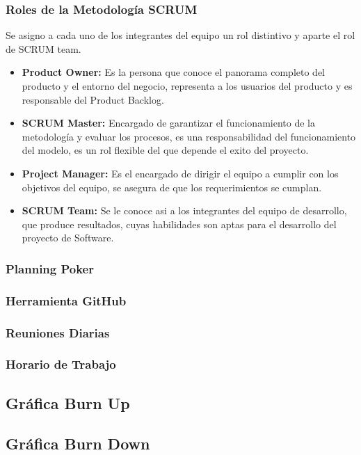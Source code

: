\subsubsection{Roles de la Metodología SCRUM}

Se asigno a cada uno de los integrantes del equipo un rol distintivo y aparte el rol de SCRUM team.

\begin{itemize}
	\item \textbf{Product Owner:} Es la persona que conoce el panorama completo del producto y el entorno del negocio, representa a los usuarios del producto y es responsable del Product Backlog.
	\item \textbf{SCRUM Master:} Encargado de garantizar el funcionamiento de la metodología y evaluar los procesos, es una responsabilidad del funcionamiento del modelo, es un rol flexible del que depende el exito del proyecto.
	\item \textbf{Project Manager:} Es el encargado de dirigir el equipo a cumplir con los objetivos del equipo, se asegura de que los requerimientos se cumplan.
	\item \textbf{SCRUM Team:} Se le conoce asi a los integrantes del equipo de desarrollo, que produce resultados, cuyas habilidades son aptas para el desarrollo del proyecto de Software.
\end{itemize}




\subsubsection{Planning Poker}

\subsubsection{Herramienta GitHub}

\subsubsection{Reuniones Diarias}

\subsubsection{Horario de Trabajo}

\subsection{Gráfica Burn Up}

\subsection{Gráfica Burn Down}
